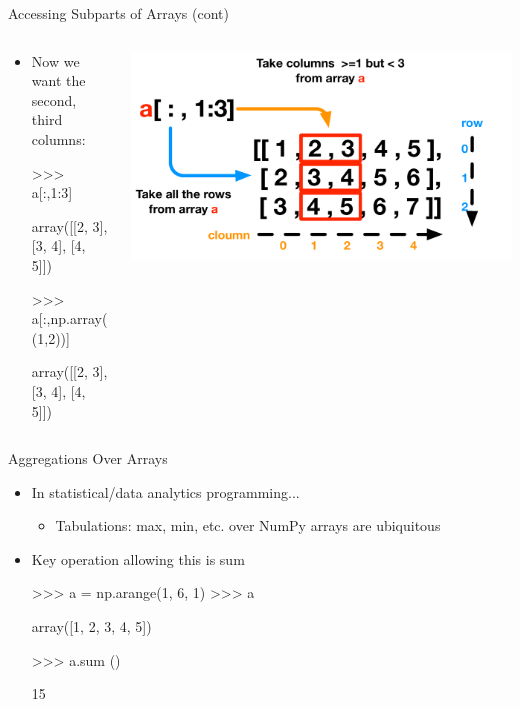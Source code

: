 \documentclass[aspectratio=169]{beamer}
\begin{document}
\begin{frame}[fragile]{Accessing Subparts of Arrays (cont)}

\begin{columns}
\begin{column}{0.5\textwidth}
\begin{itemize}
\item Now we want the second, third columns:

\begin{SQL}
>>> a[:,1:3]

array([[2, 3],
       [3, 4],
       [4, 5]])

>>> a[:,np.array((1,2))]

array([[2, 3],
       [3, 4],
       [4, 5]])

\end{SQL}
\end{itemize}
\end{column}

\begin{column}{0.5\textwidth}
{\centering\includegraphics[width=1\textwidth]{./lectPython/Canvas01.pdf}\par}	
\end{column}

\end{columns}
\end{frame}


\begin{frame}[fragile]{Aggregations Over Arrays}

\begin{itemize}
\item In statistical/data analytics programming...
	\begin{itemize}
	\item Tabulations: max, min, etc. over NumPy arrays are ubiquitous
	\end{itemize}
\item Key operation allowing this is sum

\begin{SQL}
>>> a = np.arange(1, 6, 1)
>>> a

array([1, 2, 3, 4, 5])

>>> a.sum ()

15
\end{SQL}
\end{itemize}
\end{frame}
\end{document}
